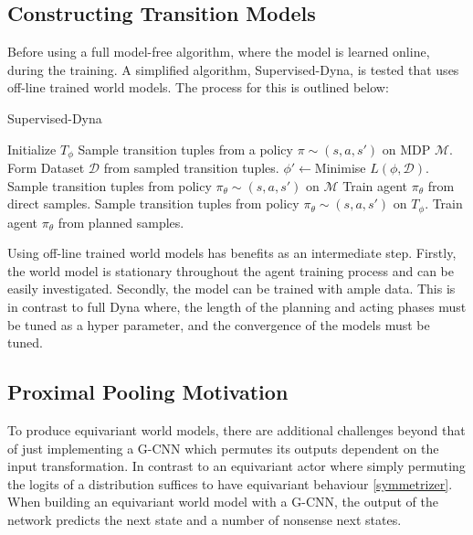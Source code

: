 \subsection{Constructing Transition Models}
Before using a full model-free algorithm, where the model is learned online, during the training. A simplified algorithm, Supervised-Dyna, is tested that uses off-line trained world models. The process for this is outlined below:
\begin{algorithm}
	\caption{Supervised-Dyna}
	\begin{algorithmic}
		\State Initialize $T_\phi$
		\State Sample transition tuples from a policy $\pi \sim (s, a, s')$ on MDP $\mathcal{M}$.
		\State Form Dataset $\mathcal{D}$ from sampled transition tuples.
		\State $\phi' \leftarrow $Minimise $L(\phi , \mathcal{D})$.
		\EndFor
		\State Sample transition tuples from policy $\pi_\theta \sim (s, a, s')$ on $\mathcal{M}$
		\State Train agent $\pi_\theta$ from direct samples.
		\EndFor
		\State Sample transition tuples from policy $\pi_\theta \sim (s, a, s')$ on $T_\phi$.
		\State Train agent $\pi_\theta$ from planned samples.
		\EndFor
		\EndFor
	\end{algorithmic}
\end{algorithm}

Using off-line trained world models has benefits as an intermediate step. Firstly, the world model is stationary throughout the agent training process and can be easily investigated. Secondly, the model can be trained with ample data. This is in contrast to full Dyna where, the length of the planning and acting phases must be tuned as a hyper parameter, and the convergence of the models must be tuned.


\subsection{Proximal Pooling Motivation}

To produce equivariant world models, there are additional challenges beyond that of just implementing a G-CNN which permutes its outputs dependent on the input transformation. In contrast to an equivariant actor where simply permuting the logits of a distribution suffices to have equivariant behaviour \ref{symmetrizer}. When building an equivariant world model with a G-CNN, the output of the network predicts the next state and a number of nonsense next states.

